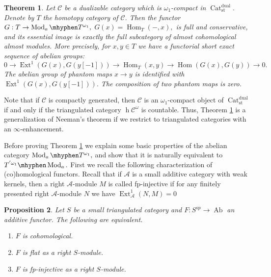 \documentclass[11pt,leqno]{amsart}
\newtheorem{theo}{Theorem}[section]
\newtheorem{prop}[theo]{Proposition}
\numberwithin{equation}{section}
\def\h{\operatorname{h}}
\def\Hom{\operatorname{Hom}}
\newcommand{\hy}{\mhyphen}
\newcommand{\Cat}{\operatorname{Cat}}
\newcommand{\st}{\operatorname{st}}
\newcommand{\dual}{\operatorname{dual}}
\newcommand{\cA}{{\mathcal A}}
\newcommand{\cC}{{\mathcal C}}
\newcommand{\Ab}{\operatorname{Ab}}
\newcommand{\Ext}{\operatorname{Ext}}
\newcommand{\Mod}{\operatorname{Mod}}
\begin{document}
\begin{theo}\label{th:Adams_rep_contravar} Let $\cC$ be a dualizable category which is $\omega_1$-compact in $\Cat_{\st}^{\dual}.$ Denote by $T$ the homotopy category of $\cC.$ Then the functor $G:T\to \Mod_a\hy T^{\omega_1},$ $G(x)=\Hom_T(-,x),$ is full and conservative, and its essential image is exactly the full subcategory of almost cohomological almost modules. More precisely, for $x,y\in T$ we have a functorial short exact sequence of abelian groups:
	\begin{equation}\label{eq:ses_for_Homs1}
		0\to \Ext^1(G(x),G(y[-1]))\to\Hom_T(x,y)\to \Hom(G(x),G(y))\to 0.
	\end{equation}
	The abelian group of phantom maps $x\to y$ is identified with $\Ext^1(G(x),G(y[-1])).$ The composition of two phantom maps is zero.\end{theo}

Note that if $\cC$ is compactly generated, then $\cC$ is an $\omega_1$-compact object of $\Cat_{\st}^{\dual}$ if and only if the triangulated category $\h\cC^{\omega}$ is countable. Thus, Theorem \ref{th:Adams_rep_contravar} is a generalization of Neeman's theorem \cite[Theorem 5.1, Proposition 4.11]{Nee97} if we restrict to triangulated categories with an $\infty$-enhancement.

Before proving Theorem \ref{th:Adams_rep_contravar} we explain some basic properties of the abelian category $\Mod_a\hy T^{\omega_1},$ and show that it is naturally equivalent to $T^{'\omega_1}\hy\Mod_a.$ First we recall the following characterization of (co)homological functors. Recall that if $\cA$ is a small additive category with weak kernels, then a right $\cA$-module $M$ is called fp-injective if for any finitely presented right $\cA$-module $N$ we have $\Ext^1_{\cA}(N,M)=0$

\begin{prop}\label{prop:cohom_functors} Let $S$ be a small triangulated category and $F:S^{op}\to\Ab$ an additive functor. The following are equivalent. 
	
	\begin{enumerate}[label=(\roman*),ref=(\roman*)]
		\item $F$ is cohomological. \label{cohom1}
		
		\item $F$ is flat as a right $S$-module. \label{cohom2}
		
		\item $F$ is fp-injective as a right $S$-module. \label{cohom3}
	\end{enumerate}
\end{prop}
\end{document}
